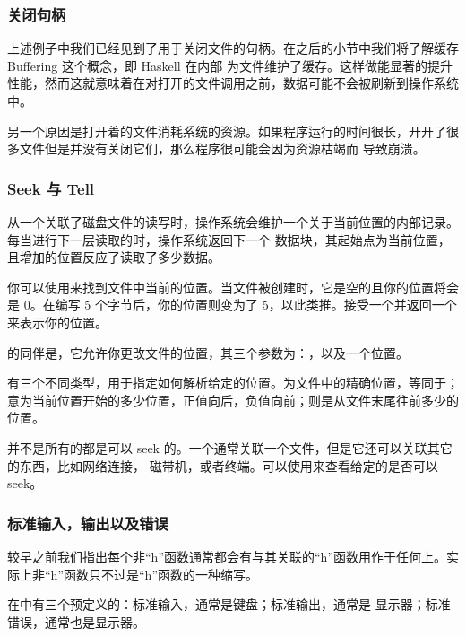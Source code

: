 \documentclass[./main.tex]{subfiles}
\begin{document}
\subsubsection*{关闭句柄}

上述例子中我们已经见到了用于关闭文件的句柄。在之后的小节中我们将了解缓存 Buffering 这个概念，即 Haskell 在内部
为文件维护了缓存。这样做能显著的提升性能，然而这就意味着在对打开的文件调用之前，数据可能不会被刷新到操作系统中。

另一个原因是打开着的文件消耗系统的资源。如果程序运行的时间很长，开开了很多文件但是并没有关闭它们，那么程序很可能会因为资源枯竭而
导致崩溃。

\subsubsection*{Seek 与 Tell}

从一个关联了磁盘文件的读写时，操作系统会维护一个关于当前位置的内部记录。每当进行下一层读取的时，操作系统返回下一个
数据块，其起始点为当前位置，且增加的位置反应了读取了多少数据。

你可以使用来找到文件中当前的位置。当文件被创建时，它是空的且你的位置将会是 0。在编写 5 个字节后，你的位置则变为了
5，以此类推。接受一个并返回一个来表示你的位置。

的同伴是，它允许你更改文件的位置，其三个参数为：，以及一个位置。

有三个不同类型，用于指定如何解析给定的位置。为文件中的精确位置，等同于；
意为当前位置开始的多少位置，正值向后，负值向前；则是从文件末尾往前多少的位置。

并不是所有的都是可以 seek 的。一个通常关联一个文件，但是它还可以关联其它的东西，比如网络连接，
磁带机，或者终端。可以使用来查看给定的是否可以 seek。

\subsubsection*{标准输入，输出以及错误}

较早之前我们指出每个非“h”函数通常都会有与其关联的“h”函数用作于任何上。实际上非“h”函数只不过是“h”函数的一种缩写。

在中有三个预定义的：标准输入，通常是键盘；标准输出，通常是
显示器；标准错误，通常也是显示器。
\end{document}
